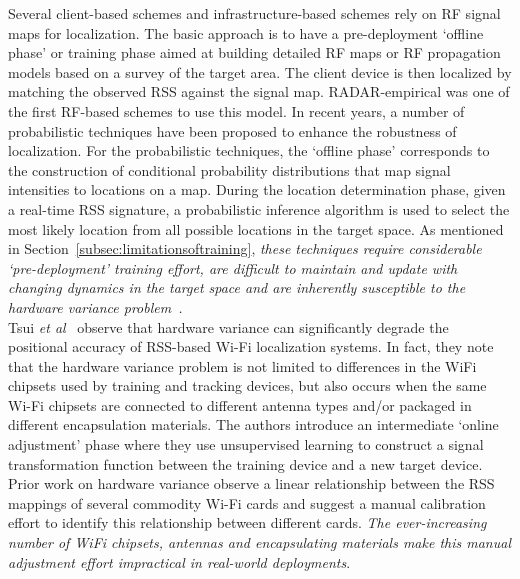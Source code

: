  Several client-based schemes and infrastructure-based schemes rely on RF signal maps for localization.  The basic approach is to have a pre-deployment `offline phase' or training phase aimed at building detailed RF maps or RF propagation models based on a survey of the target area. The client device is then localized by matching the observed RSS against the signal map. RADAR-empirical \cite{Bahl00radar:an} was one of the first RF-based schemes to use this model. In recent years, a number of probabilistic techniques \cite{Youssef:2008:HLD:1399551.1399558, Ladd:2002:RLS:570645.570674, Haeberlen:2004:PRL:1023720.1023728} have been proposed to enhance the robustness of localization. For the probabilistic techniques, the `offline phase' corresponds to the construction of conditional  probability distributions that map signal intensities to locations on a map.  %
During the location determination phase, given a real-time RSS signature,  a probabilistic inference algorithm is used to select the most likely location from all possible locations in the target space. As mentioned in Section~\ref{subsec:limitationsoftraining}, \emph{these techniques require considerable `pre-deployment' training effort, are difficult to maintain and update with changing dynamics in the target space and are inherently susceptible to the hardware variance problem~\cite{Tsui:2009:ULS:1741410.1741596}. }\\


 Tsui {\it et al}~\cite{Tsui:2009:ULS:1741410.1741596} observe that hardware variance can significantly degrade the positional accuracy of RSS-based Wi-Fi localization systems. In fact, they note that the hardware variance problem is not limited to differences in the WiFi chipsets used by training and tracking devices, but also occurs when the same Wi-Fi chipsets are connected to different antenna types and/or packaged in different encapsulation materials. The authors introduce an intermediate `online adjustment' phase where they use unsupervised learning to construct a signal transformation function between the training device and a new target device. Prior work on hardware variance \cite{Haeberlen:2004:PRL:1023720.1023728} observe a linear relationship between the RSS mappings of several commodity Wi-Fi cards and suggest a manual calibration effort to identify this relationship between different cards. {\it The ever-increasing number of WiFi chipsets, antennas and encapsulating materials make this manual adjustment effort impractical in real-world deployments}. 

